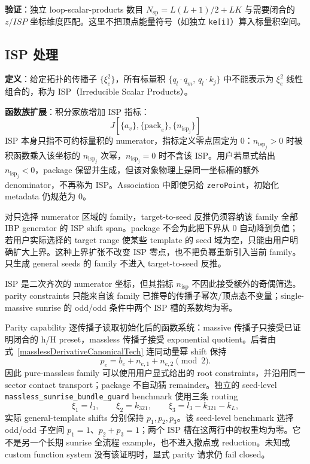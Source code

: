 ﻿\documentclass[a4paper,11pt]{article}
\begin{document}
\textbf{验证}：独立 loop-scalar-products 数目 $N_{\text{sp}} = L(L+1)/2 + LK$ 与需要闭合的 $z/ISP$ 坐标维度匹配。这里不把顶点能量符号（如独立 \texttt{ke[i]}）算入标量积空间。

\subsection{ISP 处理}

\textbf{定义}：给定拓扑的传播子 $\{\xi_e^2\}$，所有标量积 $\{q_l \cdot q_m,\, q_l \cdot k_j\}$ 中不能表示为 $\xi_e^2$ 线性组合的，称为 ISP（Irreducible Scalar Products）。

\textbf{函数族扩展}：积分家族增加 ISP 指标：
\begin{equation}
  J[\{a_v\}, \{\text{pack}_e\}, \{n_{\text{isp}_j}\}]
\end{equation}
ISP 本身只指不可约标量积的 numerator，指标定义零点固定为 $0$：$n_{\text{isp}_j}>0$ 时被积函数乘入该坐标的 $n_{\text{isp}_j}$ 次幂，$n_{\text{isp}_j}=0$ 时不含该 ISP。用户若显式给出 $n_{\text{isp}_j}<0$，package 保留并生成，但该对象物理上是同一坐标槽的额外 denominator，不再称为 ISP。Association 中即使另给 \texttt{zeroPoint}，初始化 metadata 仍规范为 $0$。

对只选择 numerator 区域的 family，target-to-seed 反推仍须容纳该 family 全部 IBP generator 的 ISP shift span。package 不会为此把下界从 $0$ 自动降到负值；若用户实际选择的 target range 使某些 template 的 seed 域为空，只能由用户明确扩大上界。这种上界扩张不改变 ISP 零点，也不把负幂重新引入当前 family。只生成 general seeds 的 family 不进入 target-to-seed 反推。

ISP 是二次齐次的 numerator 坐标，但其指标 $n_{\mathrm{isp}}$ 不因此接受额外的奇偶筛选。parity constraints 只能来自该 family 已推导的传播子幂次/顶点态不变量；single-massive sunrise 的 odd/odd 条件中两个 ISP 槽的系数均为零。

Parity capability 逐传播子读取初始化后的函数系统：massive 传播子只接受已证明闭合的 h/H preset，massless 传播子接受 exponential quotient。后者由式~\eqref{masslessDerivativeCanonicalTech} 连同动量幂 shift 保持
\begin{equation}
 p_e=b_e+n_{e,1}+n_{e,2}\pmod 2.
\end{equation}
因此 pure-massless family 可以使用用户显式给出的 root constraints，并沿用同一 sector contact transport；package 不自动猜 remainder。独立的 seed-level \texttt{massless\_sunrise\_bundle\_guard} benchmark 使用三条 routing
\begin{equation}
 \xi_1=l_3,\qquad \xi_2=k_{321},\qquad
 \xi_3=l_3-k_{321}-k_L,
\end{equation}
实际 general-template shifts 分别保持 $p_1,p_2,p_3$。该 seed-level benchmark 选择 odd/odd 子空间 $p_1=1$、$p_2+p_3=1$；两个 ISP 槽在这两行中的权重均为零。它不是另一个长期 sunrise 全流程 example，也不进入撒点或 reduction。未知或 custom function system 没有该证明时，显式 parity 请求仍 fail closed。
\end{document}
